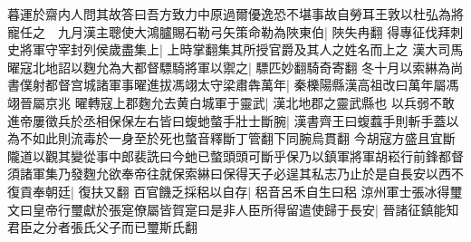 暮運於齋内人問其故答曰吾方致力中原過爾優逸恐不堪事故自勞耳王敦以杜弘為將寵任之　九月漢主聰使大鴻臚賜石勒弓矢策命勒為陜東伯|{
	陜失冉翻}
得專征伐拜刺史將軍守宰封列侯歲盡集上|{
	上時掌翻集其所授官爵及其人之姓名而上之}
漢大司馬曜寇北地詔以麴允為大都督驃騎將軍以禦之|{
	驃匹妙翻騎奇寄翻}
冬十月以索綝為尚書僕射都督宫城諸軍事曜進拔馮翊太守梁肅犇萬年|{
	秦櫟陽縣漢高祖改曰萬年屬馮翊晉屬京兆}
曜轉寇上郡麴允去黄白城軍于靈武|{
	漢北地郡之靈武縣也}
以兵弱不敢進帝屢徵兵於丞相保保左右皆曰蝮虵螫手壯士斷腕|{
	漢書齊王曰蝮蠚手則斬手蓋以為不如此則流毒於一身至於死也螫音釋斷丁管翻下同腕烏貫翻}
今胡寇方盛且宜斷隴道以觀其變從事中郎裴詵曰今虵已螫頭頭可斷乎保乃以鎮軍將軍胡崧行前鋒都督須諸軍集乃發麴允欲奉帝往就保索綝曰保得天子必逞其私志乃止於是自長安以西不復貢奉朝廷|{
	復扶又翻}
百官饑乏採稆以自存|{
	稆音呂禾自生曰稆}
涼州軍士張冰得璽文曰皇帝行璽獻於張寔僚屬皆賀寔曰是非人臣所得留遣使歸于長安|{
	晉諸征鎮能知君臣之分者張氏父子而已璽斯氏翻}


